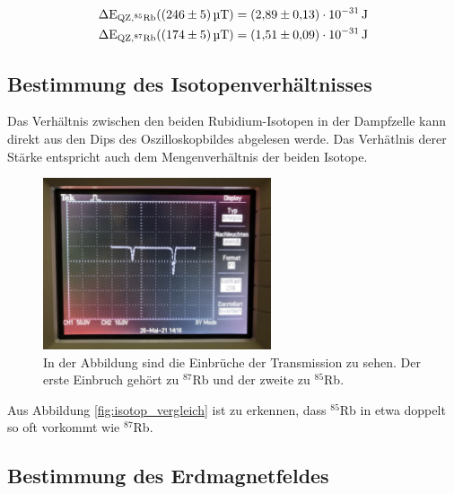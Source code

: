         \begin{align*}
            \Delta\text{E}_{\text{QZ}, {}^{85}\text{Rb}} (\SI{246 +- 5}{\micro\tesla})= \SI{2.89\pm0.13 e-31}{\joule} \\
            \Delta\text{E}_{\text{QZ}, {}^{87}\text{Rb}} (\SI{174 +- 5}{\micro\tesla})= \SI{1.51\pm0.09 e-31}{\joule}
        \end{align*}



    \subsection{Bestimmung des Isotopenverhältnisses}
        Das Verhältnis zwischen den beiden Rubidium-Isotopen in der Dampfzelle kann direkt aus den Dips des Oszilloskopbildes abgelesen werde. Das Verhätlnis derer Stärke entspricht auch dem Mengenverhältnis
        der beiden Isotope.


        \FloatBarrier

        \begin{figure}[h]
          \centering
          \includegraphics[width = 0.6\textwidth]{pictures/isotop_vergleich.jpg}
          \caption{In der Abbildung sind die Einbrüche der Transmission zu sehen. Der erste Einbruch gehört zu ${}^{87}$Rb und der zweite zu ${}^{85}$Rb.}
          \label{fig:isotop_vergleich}
        \end{figure}

        \FloatBarrier

        \noindent

        Aus Abbildung \autoref{fig:isotop_vergleich} ist zu erkennen, dass ${}^{85}$Rb in etwa doppelt so oft vorkommt wie ${}^{87}$Rb.



        \subsection{Bestimmung des Erdmagnetfeldes}

